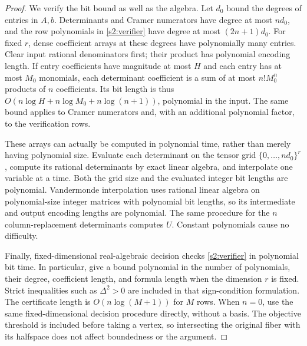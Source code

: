 \begin{proof}
We verify the bit bound as well as the algebra. Let $d_0$ bound the
degrees of entries in $A,b$. Determinants and Cramer numerators have
degree at most $nd_0$, and the row polynomials in
\eqref{s2:verifier} have degree at most $(2n+1)d_0$.
For fixed $r$, dense coefficient arrays at these degrees have
polynomially many entries. Clear input rational denominators first;
their product has polynomial encoding length. If entry coefficients
have magnitude at most $H$ and each entry has at most $M_0$ monomials,
each determinant coefficient is a sum of at most $n!M_0^n$ products
of $n$ coefficients. Its bit length is thus
$O(n\log H+n\log M_0+n\log(n+1))$, polynomial in the input.
The same bound applies to Cramer numerators and, with an additional
polynomial factor, to the verification rows.

These arrays can actually be computed in polynomial time, rather
than merely having polynomial size. Evaluate each determinant on
the tensor grid $\{0,\ldots,nd_0\}^r$, compute its rational
determinants by exact linear algebra, and interpolate one variable
at a time. Both the grid size and the evaluated integer bit lengths
are polynomial. Vandermonde interpolation uses rational linear algebra
on polynomial-size integer matrices with polynomial bit lengths,
so its intermediate and output encoding lengths are polynomial.
The same procedure for the $n$ column-replacement determinants
computes $U$. Constant polynomials cause no difficulty.

Finally, fixed-dimensional real-algebraic decision checks
\eqref{s2:verifier} in polynomial bit time. In particular,
\citet[Theorem~1.3.3 and the bit-size convention in Section~1.3]
{basu1996-on-the-combinatorial-and-algebraic}
give a bound polynomial in the number of polynomials, their degree,
coefficient length, and formula length when the dimension $r$ is fixed.
Strict inequalities such as $\Delta^2>0$ are included in that
sign-condition formulation. The certificate length is
$O(n\log(M+1))$ for $M$ rows. When $n=0$, use the same
fixed-dimensional decision procedure directly, without a basis.
The objective threshold is included before taking a vertex, so
intersecting the original fiber with its halfspace does not affect
boundedness or the argument.
\end{proof}

